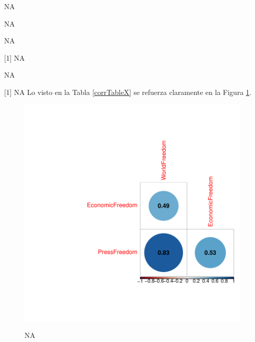 NA

NA

\begin{Schunk}
\begin{Soutput}
[1] NA
\end{Soutput}
\end{Schunk}

[1] NA

NA


[1] NA
Lo visto en la Tabla \ref{corrTableX} se refuerza claramente en la Figura \ref{corrPlotX}.

\begin{figure}[h]
\centering
\begin{adjustbox}{width=7cm,height=7cm,clip,trim=1.5cm 0.5cm 0cm 1.5cm}
\includegraphics{paperVersion_7_bivariada-corrPlotX}
\end{adjustbox}
NA
\label{corrPlotX}
\end{figure}



\endinput
